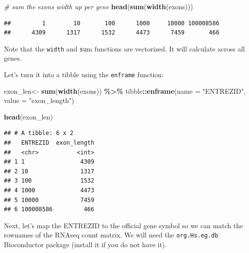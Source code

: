 \documentclass[
]{book}
\newenvironment{Shaded}{\begin{snugshade}}{\end{snugshade}}
\newcommand{\AttributeTok}[1]{\textcolor[rgb]{0.13,0.29,0.53}{#1}}
\newcommand{\CommentTok}[1]{\textcolor[rgb]{0.56,0.35,0.01}{\textit{#1}}}
\newcommand{\FunctionTok}[1]{\textcolor[rgb]{0.13,0.29,0.53}{\textbf{#1}}}
\newcommand{\NormalTok}[1]{#1}
\newcommand{\OtherTok}[1]{\textcolor[rgb]{0.56,0.35,0.01}{#1}}
\newcommand{\SpecialCharTok}[1]{\textcolor[rgb]{0.81,0.36,0.00}{\textbf{#1}}}
\newcommand{\StringTok}[1]{\textcolor[rgb]{0.31,0.60,0.02}{#1}}
\begin{document}
\begin{Shaded}
\begin{Highlighting}[]
\CommentTok{\# sum the exons width up per gene}
\FunctionTok{head}\NormalTok{(}\FunctionTok{sum}\NormalTok{(}\FunctionTok{width}\NormalTok{(exons)))}
\end{Highlighting}
\end{Shaded}

\begin{verbatim}
##         1        10       100      1000     10000 100008586 
##      4309      1317      1532      4473      7459       466
\end{verbatim}

Note that the \texttt{width} and \texttt{su}m functions are vectorized. It will calculate across all genes.

Let's turn it into a tibble using the \texttt{enframe} function:

\begin{Shaded}
\begin{Highlighting}[]
\NormalTok{exon\_len}\OtherTok{\textless{}{-}} \FunctionTok{sum}\NormalTok{(}\FunctionTok{width}\NormalTok{(exons)) }\SpecialCharTok{\%\textgreater{}\%}
\NormalTok{      tibble}\SpecialCharTok{::}\FunctionTok{enframe}\NormalTok{(}\AttributeTok{name =} \StringTok{"ENTREZID"}\NormalTok{, }\AttributeTok{value =} \StringTok{"exon\_length"}\NormalTok{)}

\FunctionTok{head}\NormalTok{(exon\_len)}
\end{Highlighting}
\end{Shaded}

\begin{verbatim}
## # A tibble: 6 x 2
##   ENTREZID  exon_length
##   <chr>           <int>
## 1 1                4309
## 2 10               1317
## 3 100              1532
## 4 1000             4473
## 5 10000            7459
## 6 100008586         466
\end{verbatim}

Next, let's map the ENTREZID to the official gene symbol so we can match the rownames of the RNAseq count matrix. We will need the \texttt{org.Hs.eg.db} Bioconductor package (install it if you
do not have it).

\begin{Shaded}
\end{Shaded}
\end{document}
